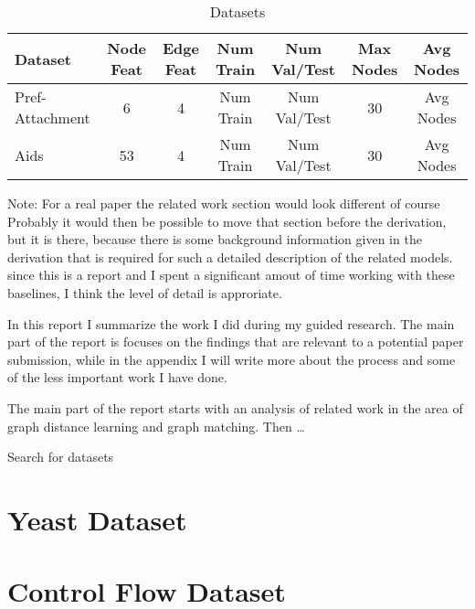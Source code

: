 \appendix
\appendixpage


\begin{table}[htbp]
    \addtolength{\tabcolsep}{-1pt}
    \fontsize{9pt}{10.25pt}\selectfont
    \centering
    \renewcommand{\arraystretch}{1.2}
    \begin{tabular}{|l|c|c|c|c|c|c|}
        \hline
        Dataset & Node Feat & Edge Feat & Num Train & Num Val/Test & Max Nodes & Avg Nodes \\
        \hline
        Pref-Attachment & 6 & 4 & Num Train & Num Val/Test & 30 & Avg Nodes \\
        \hline
        Aids & 53 & 4 & Num Train & Num Val/Test & 30 & Avg Nodes \\
        \hline
    \end{tabular}
    \caption{Datasets}
    \label{tab:ex1-data}
\end{table}

Note: For a real paper the related work section would look different of course
Probably it would then be possible to move that section before the derivation, but it is there, because there is some background information given in the derivation that is required for such a detailed description of the related models.
since this is a report and I spent a significant amout of time working with these baselines, I think the level of detail is approriate.


In this report I summarize the work I did during my guided research. The main part of the report is focuses on the findings that are relevant to a potential paper submission, while in the appendix I will write more about the process and some of the less important work I have done.

The main part of the report starts with an analysis of related work in the area of graph distance learning and graph matching. Then \dots


Search for datasets

\section{Yeast Dataset}

\section{Control Flow Dataset}

